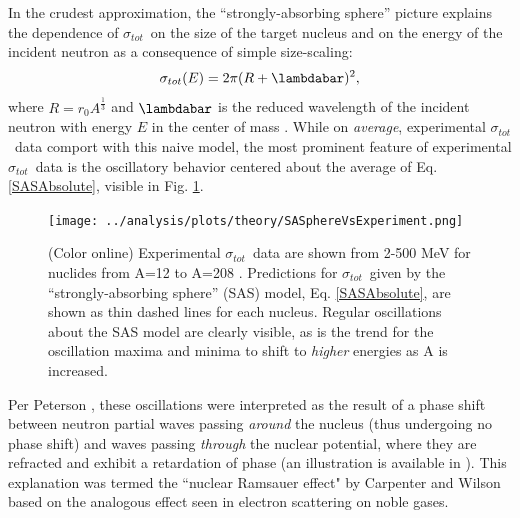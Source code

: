 \documentclass[twocolumn,secnumarabic,amssymb, nobibnotes, aps, prl,
superscriptaddress, nobalancelastpage]{revtex4}
\newcommand{\tot}{\ensuremath{\sigma_{tot}}}
\newcommand{\totRD}{\ensuremath{\sigma_{A,A'}}(E)}
\begin{document}
In the crudest approximation, the ``strongly-absorbing sphere'' picture
explains the dependence of \tot\ on the size of the target nucleus and on the
energy of the incident neutron as a consequence of simple size-scaling:
\begin{equation} \label{SASAbsolute}
    \sigma_{tot}(E) = 2\pi(R + \lambdabar)^{2},
\end{equation}
where $R=r_{0}A^{\frac{1}{3}}$ and $\lambdabar$ is the reduced wavelength
of the incident neutron with energy $E$ in the center of mass \cite{Fernbach1949, Satchler1980}. 
While on \textit{average}, experimental \tot\ data comport with this naive
model, the most prominent feature of experimental \tot\ data is the oscillatory
behavior centered about the average of Eq. \ref{SASAbsolute}, visible in Fig.
\ref{SASphereVsExperiment}.

\begin{figure}
    \texttt{[image: ../analysis/plots/theory/SASphereVsExperiment.png]}
    \caption{
        (Color online) Experimental \tot\ data are shown from 2-500
        MeV for nuclides from A=12 to A=208
        \cite{Finlay1993, Schwartz1974, Poenitz1983, Abfalterer2000, Abfalterer2001}.
        Predictions for \tot\ given by the ``strongly-absorbing sphere'' (SAS)
        model, Eq. \ref{SASAbsolute}, are shown as thin dashed lines for each nucleus.
        Regular oscillations about the SAS model are clearly visible,
        as is the trend for the oscillation
        maxima and minima to shift to \textit{higher} energies as A is increased.
    }
    \label{SASphereVsExperiment}
\end{figure}
Per Peterson \cite{Peterson1962}, these oscillations were interpreted as the 
result of a phase shift between neutron partial waves passing \textit{around} the 
nucleus (thus undergoing no phase shift) and waves passing
\textit{through} the nuclear potential, where they are refracted and exhibit a 
retardation of phase (an illustration is available in \cite{Satchler1980}).
This explanation was termed the 
``nuclear Ramsauer effect" by Carpenter and Wilson \cite{Carpenter1959} based on 
the analogous effect seen in electron scattering on noble gases.
\end{document}
